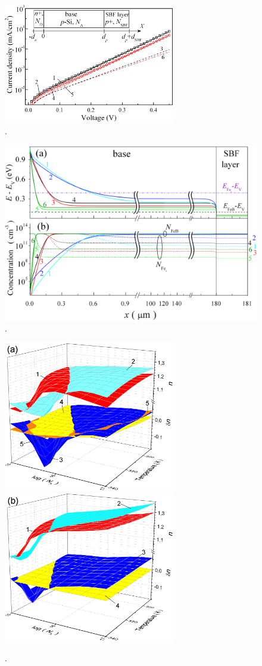 \documentclass[12pt]{article}
\begin{document}
\begin{figure}
\includegraphics[width=7.5cm]{FigIV}
\caption{.
}
\label{FigIV}
\end{figure}


\begin{figure}
\includegraphics[width=15cm]{FigEfAll}
\caption{.
}
\label{FigEf}
\end{figure}

\begin{figure}
\includegraphics[width=7.5cm]{FigFe100d24} \hfill
\includegraphics[width=7.5cm]{FigFe103d24}
\caption{.
}
\label{FigTNa}
\end{figure}
\end{document}
